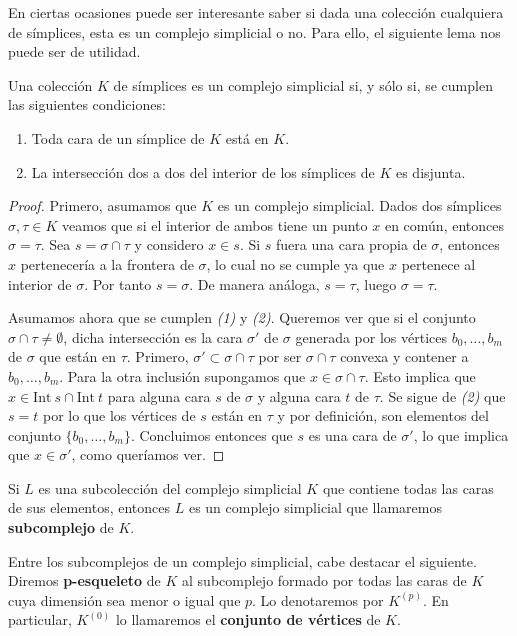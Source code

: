 En ciertas ocasiones puede ser interesante saber si dada una colección cualquiera de símplices, esta es 
un complejo simplicial o no. Para ello, el siguiente lema nos puede ser de utilidad.

\begin{lema}
	Una colección $K$ de símplices es un complejo simplicial si, y sólo si, se cumplen las siguientes 
	condiciones:
	\begin{enumerate}
		\item Toda cara de un símplice de $K$ está en $K$.
		\item La intersección dos a dos del interior de los símplices de $K$ es disjunta.
	\end{enumerate}
\end{lema}
\begin{proof}
	Primero, asumamos que $K$ es un complejo simplicial. Dados dos símplices $\sigma, \tau \in K$ veamos que si el interior de ambos tiene un punto $x$ en común, entonces $\sigma = \tau$. Sea $s = \sigma \cap \tau$ y considero $x \in s$. Si $s$ fuera una cara propia de $\sigma$, entonces $x$ pertenecería a la frontera de $\sigma$, lo cual no se cumple ya que $x$ pertenece al interior de $\sigma$. Por tanto $s = \sigma$. De manera análoga, $s = \tau$, luego $\sigma = \tau$.
	
	Asumamos ahora que se cumplen \textit{(1)} y \textit{(2)}. Queremos ver que si el conjunto $\sigma \cap \tau \neq \emptyset$,  dicha intersección es la cara $\sigma'$ de $\sigma$ generada por los vértices $b_0,\dots,b_m$ de $\sigma$ que están en $\tau$. Primero, $\sigma' \subset \sigma \cap \tau$ por ser $\sigma \cap \tau$ convexa y contener a $b_0, \dots, b_m$. Para la otra inclusión supongamos que $x \in \sigma \cap \tau$. Esto implica que $x \in \text{Int}\ s \cap \text{Int}\ t$ para alguna cara $s$ de $\sigma$ y alguna cara $t$ de $\tau$. Se sigue de \textit{(2)} que $s = t$ por lo que los vértices de $s$ están en $\tau$ y por definición, son elementos del conjunto $\{b_0, \dots, b_m\}$.  Concluimos entonces que $s$ es una cara de $\sigma'$, lo que implica que $x \in \sigma'$, como queríamos ver.
\end{proof}

\begin{definicion}
	Si $L$ es una subcolección del complejo simplicial $K$ que contiene todas las caras de sus 
	elementos, entonces $L$ es un complejo simplicial que llamaremos \textbf{subcomplejo} de $K$.
\end{definicion}
Entre los subcomplejos de un complejo simplicial, cabe destacar el siguiente. Diremos \textbf{p-esqueleto} 
de $K$ al subcomplejo formado por todas las caras de $K$ cuya dimensión sea menor o igual que $p$. Lo denotaremos por $K^{(p)}$. En particular, $K^{(0)}$ lo llamaremos el \textbf{conjunto de vértices} de $K$.

